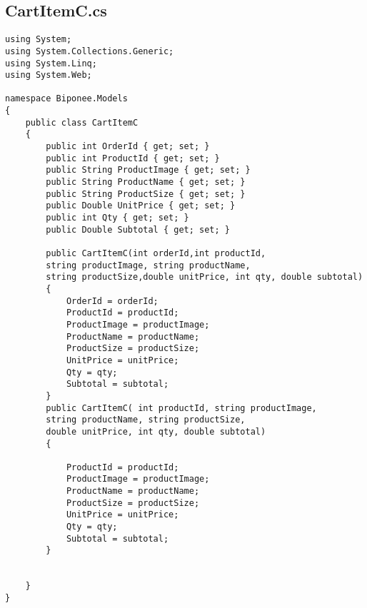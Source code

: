 \subsection{CartItemC.cs}
\begin{lstlisting}
using System;
using System.Collections.Generic;
using System.Linq;
using System.Web;

namespace Biponee.Models
{
    public class CartItemC
    {
        public int OrderId { get; set; }
        public int ProductId { get; set; }
        public String ProductImage { get; set; }
        public String ProductName { get; set; }
        public String ProductSize { get; set; }
        public Double UnitPrice { get; set; }
        public int Qty { get; set; }
        public Double Subtotal { get; set; }

        public CartItemC(int orderId,int productId, 
        string productImage, string productName, 
        string productSize,double unitPrice, int qty, double subtotal)
        {
            OrderId = orderId;
            ProductId = productId;
            ProductImage = productImage;
            ProductName = productName;
            ProductSize = productSize;
            UnitPrice = unitPrice;
            Qty = qty;
            Subtotal = subtotal;
        }
        public CartItemC( int productId, string productImage, 
        string productName, string productSize, 
        double unitPrice, int qty, double subtotal)
        {
            
            ProductId = productId;
            ProductImage = productImage;
            ProductName = productName;
            ProductSize = productSize;
            UnitPrice = unitPrice;
            Qty = qty;
            Subtotal = subtotal;
        }


    }
}

\end{lstlisting}
\newpage

